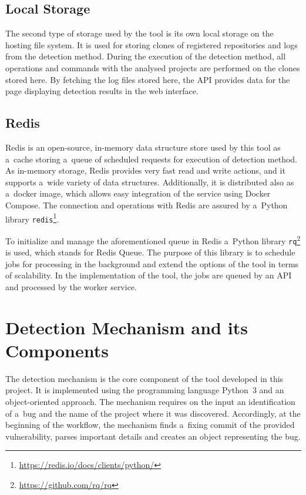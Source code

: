   \subsection*{Local Storage}
  \label{impl:local-storage}
  The second type of storage used by the tool is its own local storage on the hosting file system. It is used for storing clones of registered repositories
  and logs from the detection method. During the execution of the detection method, all operations and commands with the analysed
  projects are performed on the clones stored here. By fetching the log files stored here, the API provides data for the page
  displaying detection results in the web interface.

  \subsection*{Redis}
  \label{impl:redis}
  Redis is an open-source, in-memory data structure store used by this tool as a~cache storing a~queue of scheduled
  requests for execution of detection method. As in-memory storage, Redis provides very fast read and write actions,
  and it supports a~wide variety of data structures. Additionally, it is distributed also as a~docker image, which allows
  easy integration of the service using Docker Compose. The connection
  and operations with Redis are assured by a~Python library \texttt{redis}\footnote{\href{https://redis.io/docs/clients/python/}
  {https://redis.io/docs/clients/python/}}.

  To initialize and manage the aforementioned queue in Redis a~Python library \texttt{rq}\footnote{
  \href{https://github.com/rq/rq}{https://github.com/rq/rq}} is used, which stands for Redis Queue. The purpose of this library
  is to schedule jobs for processing in the background and extend the options of the tool in terms of scalability. In the
  implementation of the tool, the jobs are queued by an API and processed by the worker service.

  \section{Detection Mechanism and its Components}
  The detection mechanism is the core component of the tool developed in this project. It is implemented using the programming
  language Python~3 and an object-oriented approach. The mechanism requires on the input an identification of a~bug and the name of the project
  where it was discovered. Accordingly, at the beginning of the workflow, the mechanism finds a~fixing commit of the provided vulnerability,
  parses important details and creates an object representing the bug.

